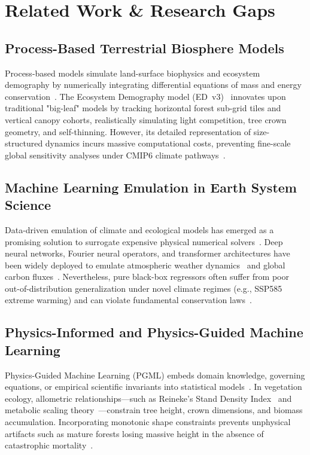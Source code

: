 \documentclass[conference]{IEEEtran}
\begin{document}
\section{Related Work \& Research Gaps}

\subsection{Process-Based Terrestrial Biosphere Models}
Process-based models simulate land-surface biophysics and ecosystem demography by numerically integrating differential equations of mass and energy conservation~\cite{bonan2008forests}. The Ecosystem Demography model (ED~v3)~\cite{longobardi2016edv3, medvigy2009mechanistic} innovates upon traditional "big-leaf" models by tracking horizontal forest sub-grid tiles and vertical canopy cohorts, realistically simulating light competition, tree crown geometry, and self-thinning. However, its detailed representation of size-structured dynamics incurs massive computational costs, preventing fine-scale global sensitivity analyses under CMIP6 climate pathways~\cite{carbon_globe_benchmark}.

\subsection{Machine Learning Emulation in Earth System Science}
Data-driven emulation of climate and ecological models has emerged as a promising solution to surrogate expensive physical numerical solvers~\cite{reichstein2019deep, beucler2021climate}. Deep neural networks, Fourier neural operators, and transformer architectures have been widely deployed to emulate atmospheric weather dynamics~\cite{lam2023learning, pathak2022fourcastnet} and global carbon fluxes~\cite{jung2019scaling, tramontana2016predicting}. Nevertheless, pure black-box regressors often suffer from poor out-of-distribution generalization under novel climate regimes (e.g., SSP585 extreme warming) and can violate fundamental conservation laws~\cite{kashinath2021physics}.

\subsection{Physics-Informed and Physics-Guided Machine Learning}
Physics-Guided Machine Learning (PGML) embeds domain knowledge, governing equations, or empirical scientific invariants into statistical models~\cite{karpatne2017theory, raissi2019physics}. In vegetation ecology, allometric relationships—such as Reineke's Stand Density Index~\cite{reineke1933perfecting} and metabolic scaling theory~\cite{west1999fourth}—constrain tree height, crown dimensions, and biomass accumulation. Incorporating monotonic shape constraints prevents unphysical artifacts such as mature forests losing massive height in the absence of catastrophic mortality~\cite{fritsch1980monotone}.
\end{document}
